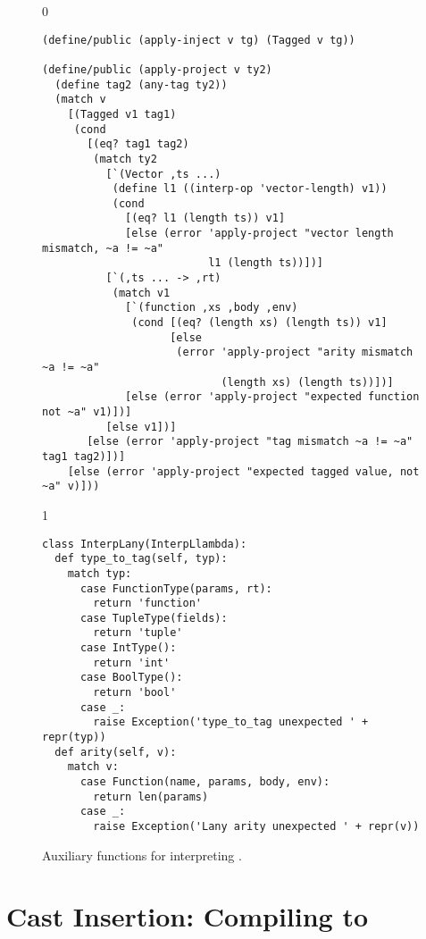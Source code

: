 \documentclass[7x10]{TimesAPriori_MIT}%
\def\racketEd{0}
\def\pythonEd{1}
\def\edition{1}
\newcommand{\pythonColor}[0]{}
\numberwithin{theorem}{chapter}
\numberwithin{definition}{chapter}
\numberwithin{equation}{chapter}
\begin{document}
\begin{figure}[btp]
  \begin{tcolorbox}[colback=white]  
{\if\edition\racketEd
\begin{lstlisting}[basicstyle=\ttfamily\footnotesize]
(define/public (apply-inject v tg) (Tagged v tg))

(define/public (apply-project v ty2)
  (define tag2 (any-tag ty2))
  (match v
    [(Tagged v1 tag1)
     (cond
       [(eq? tag1 tag2)
        (match ty2
          [`(Vector ,ts ...)
           (define l1 ((interp-op 'vector-length) v1))
           (cond
             [(eq? l1 (length ts)) v1]
             [else (error 'apply-project "vector length mismatch, ~a != ~a"
                          l1 (length ts))])]
          [`(,ts ... -> ,rt)
           (match v1
             [`(function ,xs ,body ,env)
              (cond [(eq? (length xs) (length ts)) v1]
                    [else
                     (error 'apply-project "arity mismatch ~a != ~a"
                            (length xs) (length ts))])]
             [else (error 'apply-project "expected function not ~a" v1)])]
          [else v1])]
       [else (error 'apply-project "tag mismatch ~a != ~a" tag1 tag2)])]
    [else (error 'apply-project "expected tagged value, not ~a" v)]))
\end{lstlisting}
\fi}
{\if\edition\pythonEd\pythonColor
\begin{lstlisting}[basicstyle=\ttfamily\footnotesize]
class InterpLany(InterpLlambda):
  def type_to_tag(self, typ):
    match typ:
      case FunctionType(params, rt):
        return 'function'
      case TupleType(fields):
        return 'tuple'
      case IntType():
        return 'int'
      case BoolType():
        return 'bool'
      case _:
        raise Exception('type_to_tag unexpected ' + repr(typ))
  def arity(self, v):
    match v:
      case Function(name, params, body, env):
        return len(params)
      case _:
        raise Exception('Lany arity unexpected ' + repr(v))
\end{lstlisting}
\fi}
  \end{tcolorbox}

  \caption{Auxiliary functions for interpreting \LangAny{}.}
  \label{fig:interp-Lany-aux}
\end{figure}

\clearpage

\section{Cast Insertion: Compiling \LangDyn{} to \LangAny{}}
\label{sec:compile-r7}
\end{document}
